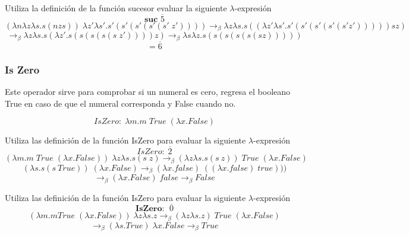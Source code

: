         \begin{exercise}
            Utiliza la definición de la función sucesor evaluar la siguiente  $\lambda$-expresión
            \[
                \textbf{suc } \overline{5}
            \]
            \[
                (\lambda n\lambda z\lambda s.s(n z s) ) \; \lambda z'\lambda s'.s'(s'(s'(s'(s' \; z')))) \rightarrow_\beta \lambda z\lambda s.s((\lambda z'\lambda s'.s'(s'(s'(s'(s'z'))))) s z)
            \]
            \[
                \rightarrow_\beta \lambda z\lambda s.s(\lambda z'.s(s(s(s(s\;z')))) z) \rightarrow_\beta \lambda s\lambda z.s(s(s(s(s(sz)))))
            \]
            \[
                = \overline{6}
            \]
        \end{exercise}

        \subsubsection{Is Zero}
        Este operador sirve para comprobar si un numeral es cero, regresa el booleano True en caso de que el numeral corresponda y False cuando no.\\
        \begin{definition}
            $$IsZero:  \; \lambda m. m\;True \;(\lambda x.False)$$
        \end{definition}

        \begin{exercise}
            Utiliza las definición de la función IsZero para evaluar la siguiente $\lambda$-expresión
            \[
                IsZero:  \; \overline{2}
            \]
            \[
                (\lambda m. m\;True \;(\lambda x.False)) \; \lambda z\lambda s.s(s\;z) \rightarrow_\beta (\lambda z\lambda s.s(s\:z)) \; True \; (\lambda x.False) 
            \]
            \[
                (\lambda s.s(s\: True)) \; (\lambda x.False) \rightarrow_\beta  (\lambda x.false) \; ((\lambda x.false) \; true)))
            \]
            \[
                 \rightarrow_\beta  (\lambda x.False) \; false \rightarrow_\beta False
            \]

        \end{exercise}

        \begin{exercise}
            Utiliza las definición de la función IsZero para evaluar la siguiente $\lambda$-expresión
            \[
                \textbf{IsZero: } \; \overline{0}
            \]
            \[
                (\lambda m. mTrue \; (\lambda x.False)) \; \lambda z\lambda s.z \rightarrow_\beta (\lambda z\lambda s.z) \; True \; (\lambda x.False)
            \]
            \[
                \rightarrow_\beta (\lambda s.True) \; \lambda x.False \rightarrow_\beta True
            \]
        \end{exercise}
        

